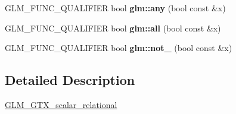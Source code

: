 \begin{DoxyCompactItemize}
\item 
\mbox{\label{scalar__relational_8inl_ad41a7e46efe59ecfa701a0d561b7e8fa}} 
G\+L\+M\+\_\+\+F\+U\+N\+C\+\_\+\+Q\+U\+A\+L\+I\+F\+I\+ER bool {\bfseries glm\+::any} (bool const \&x)
\item 
\mbox{\label{scalar__relational_8inl_a55c4531f4a0de48f87a20702d96d4289}} 
G\+L\+M\+\_\+\+F\+U\+N\+C\+\_\+\+Q\+U\+A\+L\+I\+F\+I\+ER bool {\bfseries glm\+::all} (bool const \&x)
\item 
\mbox{\label{scalar__relational_8inl_a081b70b3c919d22f18bb04e6f9c3b7ca}} 
G\+L\+M\+\_\+\+F\+U\+N\+C\+\_\+\+Q\+U\+A\+L\+I\+F\+I\+ER bool {\bfseries glm\+::not\+\_\+} (bool const \&x)
\end{DoxyCompactItemize}


\subsection{Detailed Description}
\hyperlink{group__gtx__scalar__relational}{G\+L\+M\+\_\+\+G\+T\+X\+\_\+scalar\+\_\+relational} 